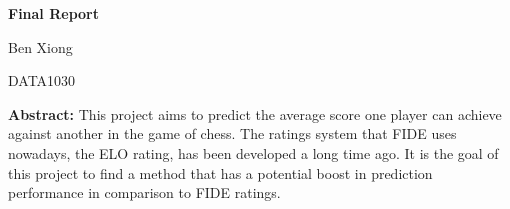 \documentclass[12pt, letterpaper]{article}
\begin{document}
\begin{center}

	\vspace*{0.3cm}
	
	\textbf{\Large Final Report}
	
	\vspace{0.5cm}
	
	Ben Xiong
	
	DATA1030
	
	
	\setlength{\parskip}{0.0in}
	
	\begin{flushleft}
	\hrulefill
	\setlength{\parskip}{0.1in}
	
	\begin{small}
	
	\textbf{Abstract:}
	This project aims to predict the average score one player can achieve against another in the game of chess. The ratings system that FIDE uses nowadays, the ELO rating, has been developed a long time ago. It is the goal of this project to find a method that has a potential boost in prediction performance in comparison to FIDE ratings.
	\setlength{\parskip}{0.0in}
	
	\hrulefill
	
	\end{small}
	
	\end{flushleft}
	
	
	
	
\end{center}

\setlength{\parskip}{0.1cm}
\end{document}
